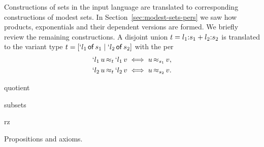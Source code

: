 Constructions of sets in the input language are translated to
corresponding constructions of modest sets. In
Section~\ref{sec:modest-sets-pers} we saw how products, exponentials
and their dependent versions are formed. We briefly review the
remaining constructions. A disjoint union
$t = \isum{\il_1}{\is_1}{\il_2}{\is_2}$ is translated to the variant type
$t = \osumtyx{\il_1}{\is_1}{\il_2}{\is_2}$ with the per
%
\begin{align*}
  \oper{t}{\oinj{\il_1}{u}}{\oinj{\il_1}{v}} &\iff \oper{s_1}{u}{v},
  \\
  \oper{t}{\oinj{\il_2}{u}}{\oinj{\il_2}{v}} &\iff \oper{s_2}{u}{v}.
\end{align*}
%

quotient

subsets

rz

Propositions and axioms.

